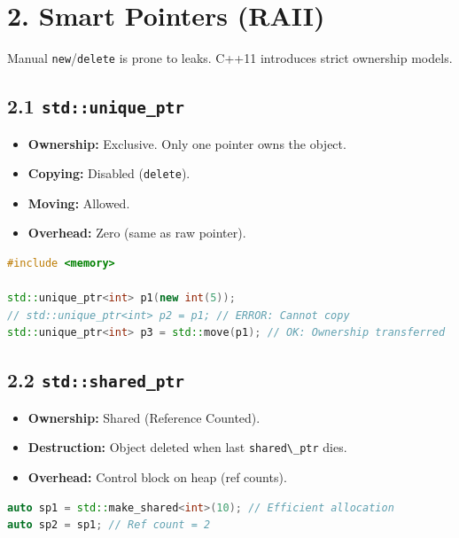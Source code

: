 \hypertarget{smart-pointers-raii}{%
\section{2. Smart Pointers (RAII)}\label{smart-pointers-raii}}

Manual \passthrough{\lstinline!new!}/\passthrough{\lstinline!delete!} is
prone to leaks. C++11 introduces strict ownership models.

\hypertarget{stdunique_ptr}{%
\subsection{\texorpdfstring{2.1
\texttt{std::unique\_ptr}}{2.1 std::unique\_ptr}}\label{stdunique_ptr}}

\begin{itemize}
\tightlist
\item
  \textbf{Ownership:} Exclusive. Only one pointer owns the object.
\item
  \textbf{Copying:} Disabled (\passthrough{\lstinline!delete!}).
\item
  \textbf{Moving:} Allowed.
\item
  \textbf{Overhead:} Zero (same as raw pointer).
\end{itemize}

\begin{lstlisting}[language={C++}]
#include <memory>

std::unique_ptr<int> p1(new int(5));
// std::unique_ptr<int> p2 = p1; // ERROR: Cannot copy
std::unique_ptr<int> p3 = std::move(p1); // OK: Ownership transferred
\end{lstlisting}

\hypertarget{stdshared_ptr}{%
\subsection{\texorpdfstring{2.2
\texttt{std::shared\_ptr}}{2.2 std::shared\_ptr}}\label{stdshared_ptr}}

\begin{itemize}
\tightlist
\item
  \textbf{Ownership:} Shared (Reference Counted).
\item
  \textbf{Destruction:} Object deleted when last
  \passthrough{\lstinline!shared\_ptr!} dies.
\item
  \textbf{Overhead:} Control block on heap (ref counts).
\end{itemize}

\begin{lstlisting}[language={C++}]
auto sp1 = std::make_shared<int>(10); // Efficient allocation
auto sp2 = sp1; // Ref count = 2
\end{lstlisting}

